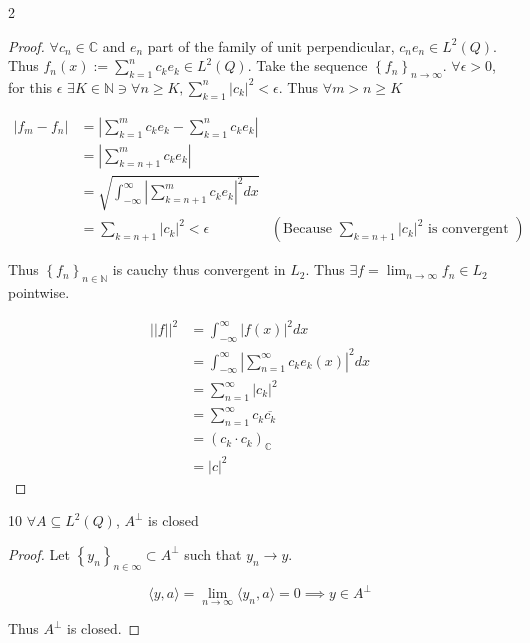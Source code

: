 \documentclass{article}
\newcommand{\C}{\mathbb{C}}
\newcommand{\N}{\mathbb{N}}
\newcommand{\abs}[1]{\left\lvert #1\right\rvert}
\newcommand{\angles}[1]{\langle #1 \rangle}
\begin{document}
\begin{PROB}{2}\label{Problem 2.}
\end{PROB}
\begin{proof}
    $\forall c_n \in \C$ and $e_n$ part of the family of unit perpendicular, $c_n e_n \in L^2(Q)$. Thus $f_n(x) := \sum_{k = 1}^{n} c_k e_k \in L^2(Q)$. Take the sequence $\left\{ f_n \right\}_{n \to \infty}$. $\forall \epsilon > 0$, for this $\epsilon$ $\exists K \in \N \ni \forall n \geq K,  \sum_{k = 1}^n \abs{c_k}^2 < \epsilon$. Thus $\forall m > n \geq K$    
    
    \begin{align*}
        \abs{f_m - f_n} &= \abs{\sum_{k = 1}^m c_k e_k - \sum_{k = 1}^{n} c_k e_k} \\
        &= \abs{\sum_{k = n + 1}^m c_k e_k} \\
        &= \sqrt{\int_{-\infty}^\infty \abs{ \sum_{k = n + 1}^m c_k e_k }^2 dx} \\
        &= \sum_{k = n + 1} \abs{c_k}^2 < \epsilon &(\text{Because $\sum_{k = n + 1} \abs{c_k}^2$ is convergent })
    \end{align*}

    Thus $\left\{ f_n \right\}_{n \in \N}$ is cauchy thus convergent in $L_2$. Thus $\exists f = \lim_{n \to \infty} f_n \in L_2$ pointwise.
    
    
    \begin{align*}
        \abs{\abs{f}}^2 &= \int_{-\infty}^{\infty} \abs{f(x)}^2 dx \\
        &= \int_{-\infty}^{\infty}\abs{\sum_{n = 1}^{\infty} c_k e_k(x)}^2 dx \\
        &= \sum_{n = 1}^{\infty}\abs{c_k}^2 \\
        &= \sum_{n = 1}^{\infty} c_k \overline{c_k} \\
        &= (c_k \cdot c_k)_{\C} \\
        &= \abs{c}^2
    \end{align*} 

    
\end{proof}

\bigskip

\begin{PROB}{10}\label{Problem 10.}
    $\forall A \subseteq L^2(Q)$, $A^\perp$ is closed   
\end{PROB}
\begin{proof}
    Let $\left\{ y_n \right\}_{n \in \infty} \subset A^\perp$ such that $y_n \to y$. 
    
    \begin{equation*}
        \angles{y, a} = \lim_{n \to \infty}\angles{y_n, a} = 0 \implies y \in A^\perp
    \end{equation*}

    Thus $A^\perp$ is closed. 
\end{proof}
\end{document}

